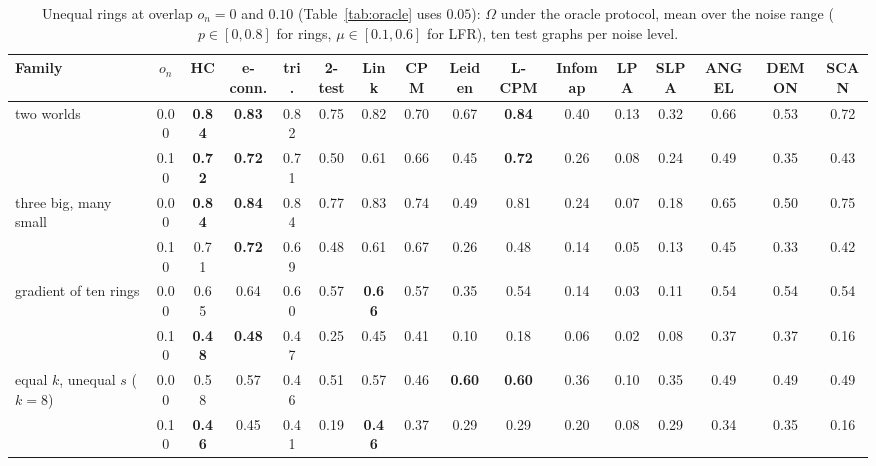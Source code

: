 \begin{table}[t]
\caption{Unequal rings at overlap $o_n=0$ and $0.10$ (Table~\ref{tab:oracle} uses $0.05$): $\Omega$ under the oracle protocol, mean over the noise range ($p\in[0,0.8]$ for rings, $\mu\in[0.1,0.6]$ for LFR), ten test graphs per noise level.}
\label{tab:overlaplevels}
\scriptsize\setlength{\tabcolsep}{2pt}
\begin{ruledtabular}
\begin{tabular}{lccccccccccccccc}
Family & $o_n$ & HC & e-conn. & tri. & 2-test & Link & CPM & Leiden & L-CPM & Infomap & LPA & SLPA & ANGEL & DEMON & SCAN \\
\hline
two worlds & 0.00 & \textbf{0.84} & \textbf{0.83} & 0.82 & 0.75 & 0.82 & 0.70 & 0.67 & \textbf{0.84} & 0.40 & 0.13 & 0.32 & 0.66 & 0.53 & 0.72 \\
 & 0.10 & \textbf{0.72} & \textbf{0.72} & 0.71 & 0.50 & 0.61 & 0.66 & 0.45 & \textbf{0.72} & 0.26 & 0.08 & 0.24 & 0.49 & 0.35 & 0.43 \\
three big, many small & 0.00 & \textbf{0.84} & \textbf{0.84} & 0.84 & 0.77 & 0.83 & 0.74 & 0.49 & 0.81 & 0.24 & 0.07 & 0.18 & 0.65 & 0.50 & 0.75 \\
 & 0.10 & 0.71 & \textbf{0.72} & 0.69 & 0.48 & 0.61 & 0.67 & 0.26 & 0.48 & 0.14 & 0.05 & 0.13 & 0.45 & 0.33 & 0.42 \\
gradient of ten rings & 0.00 & 0.65 & 0.64 & 0.60 & 0.57 & \textbf{0.66} & 0.57 & 0.35 & 0.54 & 0.14 & 0.03 & 0.11 & 0.54 & 0.54 & 0.54 \\
 & 0.10 & \textbf{0.48} & \textbf{0.48} & 0.47 & 0.25 & 0.45 & 0.41 & 0.10 & 0.18 & 0.06 & 0.02 & 0.08 & 0.37 & 0.37 & 0.16 \\
equal $k$, unequal $s$ ($k{=}8$) & 0.00 & 0.58 & 0.57 & 0.46 & 0.51 & 0.57 & 0.46 & \textbf{0.60} & \textbf{0.60} & 0.36 & 0.10 & 0.35 & 0.49 & 0.49 & 0.49 \\
 & 0.10 & \textbf{0.46} & 0.45 & 0.41 & 0.19 & \textbf{0.46} & 0.37 & 0.29 & 0.29 & 0.20 & 0.08 & 0.29 & 0.34 & 0.35 & 0.16 \\
\end{tabular}
\end{ruledtabular}
\end{table}

